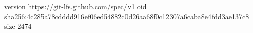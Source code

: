 version https://git-lfs.github.com/spec/v1
oid sha256:4c285a78cdddd916ef06ed54882c0d26aa68f0c12307a6caba8e4fdd3ae137c8
size 2474
